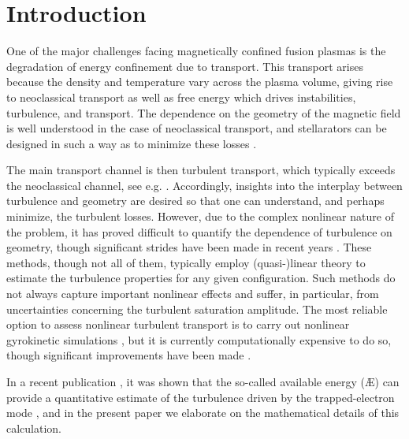 \section{Introduction} \label{sec:outline}
    One of the major challenges facing magnetically confined fusion plasmas is the degradation of energy confinement due to transport. This transport arises because the density and temperature vary across the plasma volume, giving rise to neoclassical transport as well as free energy which drives instabilities, turbulence, and transport. The dependence on the geometry of the magnetic field is well understood in the case of neoclassical transport, and stellarators can be designed in such a way as to minimize these losses \citep{Wolf2017MajorStellarator,Klinger2019OverviewOperation,Dinklage2018MagneticStellarator,beidler2021demonstration}. \par
    The main transport channel is then turbulent transport, which typically exceeds the neoclassical channel, see e.g. \citet{Bozhenkov2020High-performance7-X,beidler2021demonstration}. Accordingly, insights into the interplay between turbulence and geometry are desired so that one can understand, and perhaps minimize, the turbulent losses. However, due to the complex nonlinear nature of the problem, it has proved difficult to quantify the dependence of turbulence on geometry, though significant strides have been made in recent years \citep{Barnes2011CriticallyPlasmas,Proll2012ResilienceInstabilities,Proll2022TurbulenceGradient,Pueschel2016StellaratorModeling,Citrin2017TractableQuaLiKiz,Helander2013CollisionlessModes,Plunk2014CollisionlessMode}. 
    These methods, though not all of them, typically employ (quasi-)linear theory to estimate the turbulence properties for any given configuration. Such methods do not always capture important nonlinear effects and suffer, in particular, from uncertainties concerning the turbulent saturation amplitude. The most reliable option to assess nonlinear turbulent transport is to carry out nonlinear gyrokinetic simulations \citep{Beer1995FieldTurbulence,Garbet2010GyrokineticTransport}, but it is currently computationally expensive to do so, though significant improvements have been made \citep{Mandell2022GX:Design}. \par
    In a recent publication \citep{Mackenbach2022AvailableTransport}, it was shown that the so-called available energy (\AE{}) can provide a quantitative estimate of the turbulence driven by the trapped-electron mode \citep{Kadomtsev1967PlasmaGeometry,Dannert2005GyrokineticTurbulence}, and in the present paper we elaborate on the mathematical details of this calculation. 
